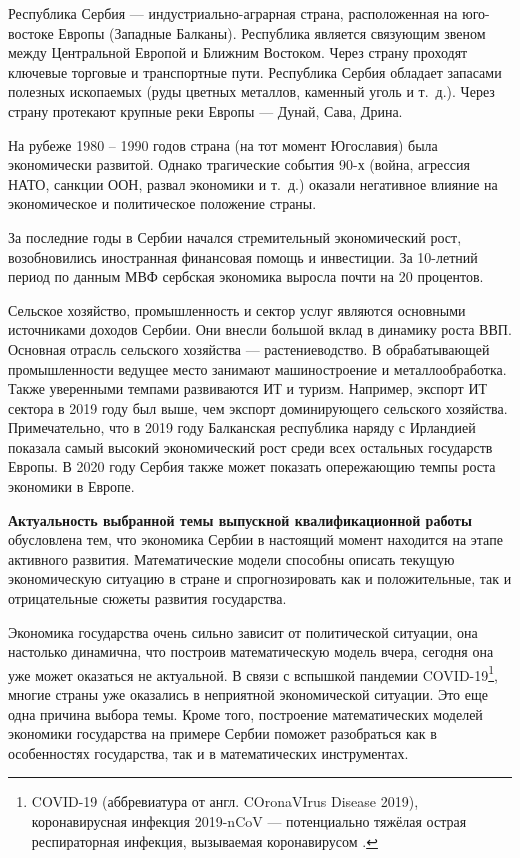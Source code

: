 \Introduction

Республика Сербия --- индустриально-аграрная страна, расположенная на юго-востоке Европы (Западные Балканы).
Республика является связующим звеном между Центральной Европой и Ближним Востоком.
Через страну проходят ключевые торговые и транспортные пути.
Республика Сербия обладает запасами полезных ископаемых (руды цветных металлов, каменный уголь и т.~д.).
Через страну протекают крупные реки Европы --- Дунай, Сава, Дрина.

На рубеже 1980 -- 1990 годов страна (на тот момент Югославия) была экономически развитой.
Однако трагические события 90-х (война, агрессия НАТО, санкции ООН, развал экономики и т.~д.) оказали негативное влияние на экономическое и политическое положение страны.

За последние годы в Сербии начался стремительный экономический рост, возобновились иностранная финансовая помощь и инвестиции.
За 10-летний период по данным МВФ сербская экономика выросла почти на 20 процентов.

Сельское хозяйство, промышленность и сектор услуг являются основными источниками доходов Сербии.
Они внесли большой вклад в динамику роста ВВП.
Основная отрасль сельского хозяйства --- растениеводство.
В обрабатывающей промышленности ведущее место занимают машиностроение и металлообработка.
Также уверенными темпами развиваются ИТ и туризм.
Например, экспорт ИТ сектора в 2019 году был выше, чем экспорт доминирующего сельского хозяйства.
Примечательно, что в 2019 году Балканская республика наряду с Ирландией показала самый высокий экономический рост среди всех остальных государств Европы.
В 2020 году Сербия также может показать опережающию темпы роста экономики в Европе.

\textbf{Актуальность выбранной темы выпускной квалификационной работы } обусловлена тем, что экономика Сербии в настоящий момент находится на этапе активного развития.
Математические модели способны описать текущую экономическую ситуацию в стране и спрогнозировать как и положительные, так и отрицательные сюжеты развития государства.

Экономика государства очень сильно зависит от политической ситуации, она настолько динамична, что построив математическую модель вчера, сегодня она уже может оказаться не актуальной. В связи с вспышкой пандемии COVID-19\footnote{COVID-19 (аббревиатура от англ. COronaVIrus Disease 2019), коронавирусная инфекция 2019-nCoV --- потенциально тяжёлая острая респираторная инфекция, вызываемая коронавирусом \cite{wiki:Coronavirus_disease_2019}.}, многие страны уже оказались в неприятной экономической ситуации.
Это еще одна причина выбора темы.
Кроме того, построение математических моделей экономики государства на примере Сербии поможет разобраться как в особенностях государства, так и в математических инструментах.

